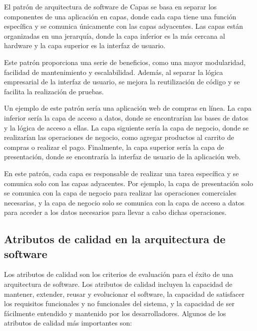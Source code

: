 \documentclass[executivepaper]{article}
\begin{document}
El patrón de arquitectura de software de Capas se basa en separar los componentes de una aplicación en capas, donde cada capa tiene una función específica y se comunica únicamente con las capas adyacentes. Las capas están organizadas en una jerarquía, donde la capa inferior es la más cercana al hardware y la capa superior es la interfaz de usuario.

Este patrón proporciona una serie de beneficios, como una mayor modularidad, facilidad de mantenimiento y escalabilidad. Además, al separar la lógica empresarial de la interfaz de usuario, se mejora la reutilización de código y se facilita la realización de pruebas.

Un ejemplo de este patrón sería una aplicación web de compras en línea. La capa inferior sería la capa de acceso a datos, donde se encontrarían las bases de datos y la lógica de acceso a ellas. La capa siguiente sería la capa de negocio, donde se realizarían las operaciones de negocio, como agregar productos al carrito de compras o realizar el pago. Finalmente, la capa superior sería la capa de presentación, donde se encontraría la interfaz de usuario de la aplicación web.

En este patrón, cada capa es responsable de realizar una tarea específica y se comunica solo con las capas adyacentes. Por ejemplo, la capa de presentación solo se comunica con la capa de negocio para realizar las operaciones comerciales necesarias, y la capa de negocio solo se comunica con la capa de acceso a datos para acceder a los datos necesarios para llevar a cabo dichas operaciones.

\subsection{Atributos de calidad en la arquitectura de software}

Los atributos de calidad son los criterios de evaluación para el éxito de una arquitectura de software. Los atributos de calidad incluyen la capacidad de mantener, extender, reusar y evolucionar el software, la capacidad de satisfacer los requisitos funcionales y no funcionales del sistema, y la capacidad de ser fácilmente entendido y mantenido por los desarrolladores. Algunos de los atributos de calidad más importantes son:
\end{document}
